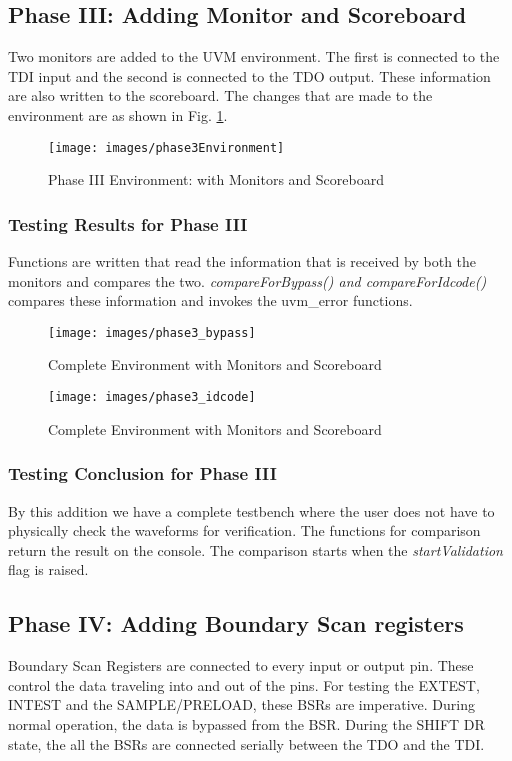 \documentclass[a4paper,11pt]{article}
\begin{document}
\FloatBarrier
\subsection{Phase III: Adding Monitor and Scoreboard}
Two monitors are added to the UVM environment. The first is connected to the TDI input and the second is connected to the TDO output. These information are also written to the scoreboard. The changes that are made to the environment are as shown in Fig. \ref{fig:Phase III Environment}.

\begin{figure}[ht]
\centering
\texttt{[image: images/phase3Environment]}
\caption{Phase III Environment: with Monitors and Scoreboard}
\label{fig:Phase III Environment}
\end{figure}

\subsubsection{Testing Results for Phase III}

Functions are written that read the information that is received by both the monitors and compares the two. \textit{compareForBypass() and compareForIdcode()} compares these information and invokes the uvm\_error functions.

\begin{figure}[ht]
\centering
\texttt{[image: images/phase3\_bypass]}
\caption{Complete Environment with Monitors and Scoreboard}
\end{figure}


\begin{figure}[ht]
\centering
\texttt{[image: images/phase3\_idcode]}
\caption{Complete Environment with Monitors and Scoreboard}
\end{figure}


\subsubsection{Testing Conclusion for Phase III}

By this addition we have a complete testbench where the user does not have to physically check the waveforms for verification. The functions for comparison return the result on the console. The comparison starts when the \textit{startValidation} flag is raised.


\FloatBarrier
\subsection{Phase IV: Adding Boundary Scan registers}
Boundary Scan Registers are connected to every input or output pin. These control the data traveling into and out of the pins. For testing the EXTEST, INTEST and the SAMPLE/PRELOAD, these BSRs are imperative. During normal operation, the data is bypassed from the BSR. During the SHIFT DR state, the all the BSRs are connected serially between the TDO and the TDI.
\end{document}
